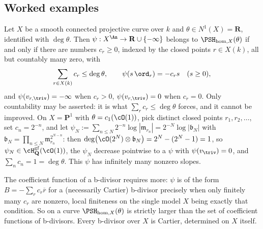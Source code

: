 \subsection{Worked examples}
\label{sec:ch35-bdivisor-examples}

\begin{proposition}
\label{prop:ch35-curve-classification}
Let $X$ be a smooth connected projective curve over $k$ and
$\theta\in N^1(X)=\mathbf R$, identified with $\deg\theta$.  Then
$\psi:X^{\An}\to\mathbf R\cup\{-\infty\}$ belongs to
$\PSH_{\mathrm{hom},X}(\theta)$ if and only if there are numbers
$c_r\geq0$, indexed by the closed points $r\in X(k)$, all but countably
many zero, with
\begin{equation}
\label{eq:ch35-curve-classification}
 \sum_{r\in X(k)}c_r\leq\deg\theta,
 \qquad
 \psi(s\,\ord_r)=-c_rs\quad(s\geq0),
\end{equation}
and $\psi(v_{r,\triv})=-\infty$ when $c_r>0$, $\psi(v_{r,\triv})=0$
when $c_r=0$.  Only countability may be asserted: it is what
$\sum_rc_r\leq\deg\theta$ forces, and it cannot be improved.  On
$X=\mathbf P^1$ with $\theta=c_1(\cO(1))$, pick distinct closed points
$r_1,r_2,\dots$, set $c_n=2^{-n}$, and let
$\psi_N:=\sum_{n\leq N}2^{-n}\log|\mathfrak m_{r_n}|
=2^{-N}\log|\mathfrak b_N|$ with
$\mathfrak b_N=\prod_{n\leq N}\mathfrak m_{r_n}^{2^{N-n}}$: then
$\deg\bigl(\cO(2^N)\otimes\mathfrak b_N\bigr)=2^N-(2^N-1)=1$, so
$\psi_N\in\cH^{\mathrm{gf}}_{\mathbf Q}(\cO(1))$, the $\psi_N$ decrease
pointwise to a $\psi$ with $\psi(v_{\triv})=0$, and
$\sum_nc_n=1=\deg\theta$.  This $\psi$ has infinitely many nonzero
slopes.

The coefficient function of a b-divisor requires more: $\psi$ is of the
form $B=-\sum_rc_r\overline r$ for a (necessarily Cartier) b-divisor
precisely when only finitely many $c_r$ are nonzero, local finiteness on
the single model $X$ being exactly that condition.  So on a curve
$\PSH_{\mathrm{hom},X}(\theta)$ is strictly larger than the set of
coefficient functions of b-divisors.  Every b-divisor over $X$ is Cartier,
determined on $X$ itself.
\end{proposition}


